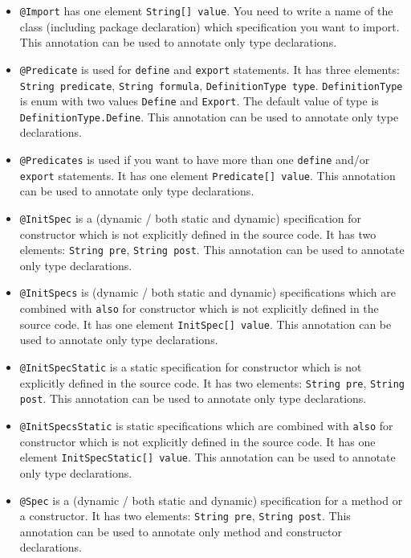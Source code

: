\documentclass{article}
\begin{document}
\begin{itemize}
\item \texttt{@Import} has one element \texttt{String[] value}. You need to write a name of the class (including package declaration) which specification you want to import. This annotation can be used to annotate only type declarations.
\item \texttt{@Predicate} is used for \texttt{define} and \texttt{export} statements. It has three elements: \texttt{String predicate}, \texttt{String formula}, \texttt{DefinitionType type}. \texttt{DefinitionType} is enum with two values \texttt{Define} and \texttt{Export}.  The default value of type is \texttt{DefinitionType.Define}. This annotation can be used to annotate only type declarations.
\item \texttt{@Predicates} is used if you want to have more than one  \texttt{define} and/or \texttt{export} statements. It has one element \texttt{Predicate[] value}. This annotation can be used to annotate only type declarations.
\item \texttt{@InitSpec} is a (dynamic / both static and dynamic) specification for constructor which is not explicitly defined in the source code. It has two elements: \texttt{String pre}, \texttt{String post}. This annotation can be used to annotate only type declarations.
\item \texttt{@InitSpecs} is (dynamic / both static and dynamic) specifications which are combined with \texttt{also} for constructor which is not explicitly defined in the source code. It has one element \texttt{InitSpec[] value}. This annotation can be used to annotate only type declarations.
\item \texttt{@InitSpecStatic} is a static specification for constructor which is not explicitly defined in the source code. It has two elements: \texttt{String pre}, \texttt{String post}. This annotation can be used to annotate only type declarations.
\item \texttt{@InitSpecsStatic} is static specifications which are combined with \texttt{also} for constructor which is not explicitly defined in the source code. It has one element \texttt{InitSpecStatic[] value}. This annotation can be used to annotate only type declarations.
\item \texttt{@Spec} is a (dynamic / both static and dynamic) specification for a method or a constructor. It has two elements: \texttt{String pre}, \texttt{String post}. This annotation can be used to annotate only method and constructor declarations.

\end{itemize}
\end{document}

